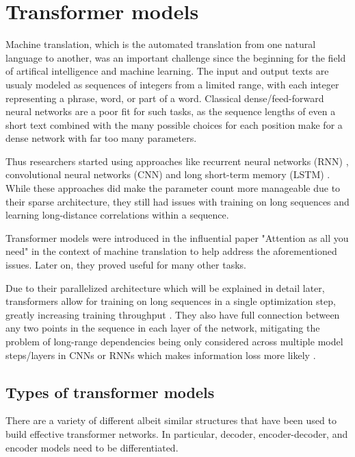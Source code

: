 \section{Transformer models}

Machine translation, which is the automated translation from one natural language to another, was an important challenge since the beginning for the field of artifical intelligence and machine learning.
The input and output texts are usualy modeled as sequences of integers from a limited range, with each integer representing a phrase, word, or part of a word.
Classical dense/feed-forward neural networks are a poor fit for such tasks, as the sequence lengths of even a short text combined with the many possible choices for each position make for a dense network with far too many parameters.

Thus researchers started using approaches like recurrent neural networks (RNN) \cite{phrasereps}, convolutional neural networks (CNN) \cite{convseq} and long short-term memory (LSTM) \cite{seq2seq}.
While these approaches did make the parameter count more manageable due to their sparse architecture, they still had issues with training on long sequences and learning long-distance correlations within a sequence.

Transformer models were introduced in the influential paper "Attention as all you need" \cite{allyouneed} in the context of machine translation to help address the aforementioned issues. Later on, they proved useful for many other tasks. 

Due to their parallelized architecture which will be explained in detail later, transformers allow for training on long sequences in a single optimization step, greatly increasing training throughput . They also have full connection between any two points in the sequence in each layer of the network, mitigating the problem of long-range dependencies being only considered across multiple model steps/layers in CNNs or RNNs which makes information loss more likely .

\subsection{Types of transformer models}

There are a variety of different albeit similar structures that have been used to build effective transformer networks. In particular, decoder, encoder-decoder, and encoder models need to be differentiated.


